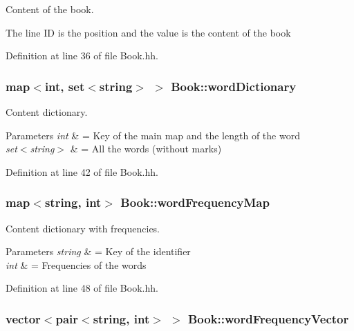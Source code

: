 Content of the book. 

The line I\-D is the position and the value is the content of the book 

Definition at line 36 of file Book.\-hh.

\hypertarget{class_book_a3e21a804bd433b6c1b05790856ec973f}{
\subsubsection[{word\-Dictionary}]{\setlength{\rightskip}{0pt plus 5cm}map$<$int, set$<$string$>$ $>$ Book\-::word\-Dictionary\hspace{0.3cm}{\ttfamily [private]}}}\label{class_book_a3e21a804bd433b6c1b05790856ec973f}


Content dictionary. 


\begin{DoxyParams}{Parameters}
{\em int} & = Key of the main map and the length of the word \\
\hline
{\em set$<$string$>$} & = All the words (without marks) \\
\hline
\end{DoxyParams}


Definition at line 42 of file Book.\-hh.

\hypertarget{class_book_a18b73c8d2b492cad5b7b0c187b08dfc0}{
\subsubsection[{word\-Frequency\-Map}]{\setlength{\rightskip}{0pt plus 5cm}map$<$string, int$>$ Book\-::word\-Frequency\-Map\hspace{0.3cm}{\ttfamily [private]}}}\label{class_book_a18b73c8d2b492cad5b7b0c187b08dfc0}


Content dictionary with frequencies. 


\begin{DoxyParams}{Parameters}
{\em string} & = Key of the identifier \\
\hline
{\em int} & = Frequencies of the words \\
\hline
\end{DoxyParams}


Definition at line 48 of file Book.\-hh.

\hypertarget{class_book_ac58a87d14a302f7d437c1eaa1f1901fb}{
\subsubsection[{word\-Frequency\-Vector}]{\setlength{\rightskip}{0pt plus 5cm}vector$<$pair$<$string, int$>$ $>$ Book\-::word\-Frequency\-Vector\hspace{0.3cm}{\ttfamily [private]}}}\label{class_book_ac58a87d14a302f7d437c1eaa1f1901fb}


